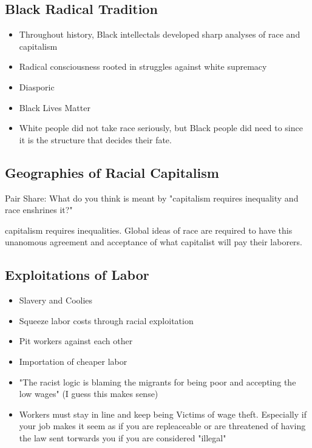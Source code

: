 \documentclass{article}
\begin{document}
\subsection{Black Radical Tradition}
\begin{itemize}
  \item Throughout history, Black intellectals
    developed sharp analyses of race and capitalism
  \item Radical consciousness rooted in struggles against white supremacy
  \item Diasporic
  \item Black Lives Matter
  \item White people did not take race seriously, but Black people did need to
    since it is the structure that decides their fate.
\end{itemize}

\subsection{Geographies of Racial Capitalism}
Pair Share: What do you think is meant by "capitalism requires
inequality and race enshrines it?"

capitalism requires inequalities. Global ideas of race are required to have 
this unanomous agreement and acceptance of what capitalist will pay their
laborers.

\subsection{Exploitations of Labor}
\begin{itemize}
  \item Slavery and Coolies
  \item Squeeze labor costs through racial exploitation
  \item Pit workers against each other
  \item Importation of cheaper labor
  \item "The racist logic is blaming the migrants for being poor and accepting the low wages" 
    (I guess this makes sense)
  \item Workers must stay in line and keep being Victims of wage theft. Especially if your job
    makes it seem as if you are repleaceable or are threatened of having the law
    sent torwards you if you are considered "illegal"
\end{itemize}
\end{document}
